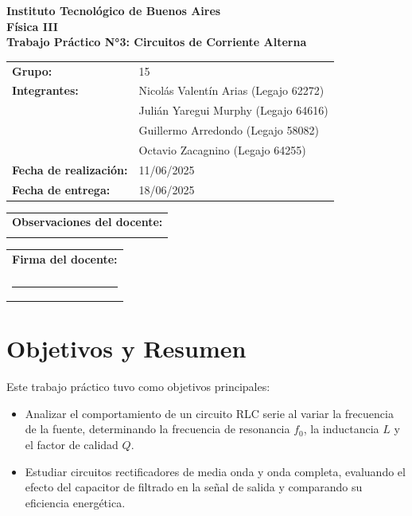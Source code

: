 \documentclass[a4paper,12pt]{article}
\begin{document}
\begin{titlepage}
    \centering
    \vspace*{2cm}
    \textbf{\Large Instituto Tecnológico de Buenos Aires} \\
    \vspace{0.5cm}
    \textbf{\large Física III} \\
    \vspace{1cm}
    \textbf{\LARGE Trabajo Práctico N°3: Circuitos de Corriente Alterna} \\
    \vspace{1.5cm}
    \begin{tabular}{ll}
        \textbf{Grupo:} & 15 \\
        \textbf{Integrantes:} & Nicolás Valentín Arias (Legajo 62272) \\
                              & Julián Yaregui Murphy (Legajo 64616) \\
                              & Guillermo Arredondo (Legajo 58082) \\
                              & Octavio Zacagnino (Legajo 64255) \\
        \textbf{Fecha de realización:} & 11/06/2025 \\
        \textbf{Fecha de entrega:} & 18/06/2025 \\
    \end{tabular}
    \vspace{2cm}
    \begin{tabular}{|p{12cm}|}
        \hline
        \textbf{Observaciones del docente:} \\
        \vspace{2cm} \\
        \hline
    \end{tabular}
    \vspace{1cm}
    \begin{tabular}{p{6cm}}
        \textbf{Firma del docente:} \\
        \vspace{1cm} \\
        \hrule
    \end{tabular}
\end{titlepage}

\section{Objetivos y Resumen}
Este trabajo práctico tuvo como objetivos principales:
\begin{itemize}
    \item Analizar el comportamiento de un circuito RLC serie al variar la frecuencia de la fuente, determinando la frecuencia de resonancia \( f_0 \), la inductancia \( L \) y el factor de calidad \( Q \).
    \item Estudiar circuitos rectificadores de media onda y onda completa, evaluando el efecto del capacitor de filtrado en la señal de salida y comparando su eficiencia energética.
\end{itemize}
\end{document}
